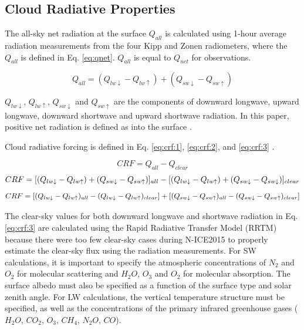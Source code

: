 \subsection{Cloud Radiative Properties}
The all-sky net radiation at the surface $Q_{all}$ is calculated using 1-hour average radiation measurements from the four Kipp and Zonen radiometers, where the $Q_{all}$ is defined in Eq. \ref{eq:qnet}. $Q_{all}$ is equal to $Q_{net}$ for observations.

\begin{equation}\label{eq:qnet}
Q_{all} = (Q_{lw \downarrow} - Q_{lw \uparrow}) + (Q_{sw \downarrow} - Q_{sw \uparrow})
\end{equation}

$Q_{lw \downarrow}$, $Q_{lw \uparrow}$, $Q_{sw \downarrow}$ and $Q_{sw \uparrow}$ are the components of downward longwave, upward longwave, downward shortwave and upward shortwave radiation. In this paper, positive net radiation is defined as into the surface \citep{miller:2015}.

Cloud radiative forcing is defined in Eq. \ref{eq:crf:1}, \ref{eq:crf:2}, and \ref{eq:crf:3} \citep{ramanathan:1989, miller:2015}.

\begin{equation}\label{eq:crf:1}
CRF = Q_{all} - Q_{clear}
\end{equation}
\begin{dmath}\label{eq:crf:2}
CRF = [(Q_{lw \downarrow} - Q_{lw \uparrow}) + (Q_{sw \downarrow} - Q_{sw \uparrow})]_{all} \\
\\ - [(Q_{lw \downarrow} - Q_{lw \uparrow}) + (Q_{sw \downarrow} - Q_{sw \downarrow})]_{clear}
\end{dmath}
\begin{dmath}\label{eq:crf:3}
CRF = [(Q_{lw \downarrow} - Q_{lw \uparrow})_{all} - (Q_{lw \downarrow} - Q_{lw \uparrow})_{clear}] \\
\\ + [(Q_{sw \downarrow} - Q_{sw \uparrow})_{all} -  (Q_{sw \downarrow} - Q_{sw \uparrow})_{clear}]
\end{dmath}

The clear-sky values for both downward longwave and shortwave radiation in Eq. \ref{eq:crf:3} are calculated using the Rapid Radiative Transfer Model (RRTM) \citep{mlawer:1997} because there were too few clear-sky cases during N-ICE2015 to properly estimate the clear-sky flux using the radiation measurements. For SW calculations, it is important to specify the atmospheric concentrations of $N_{2}$ and $O_{2}$ for molecular scattering and $H_{2}O$, $O_{3}$ and $O_{2}$ for molecular absorption. The surface albedo must also be specified as a function of the surface type and solar zenith angle. For LW calculations, the vertical temperature structure must be specified, as well as the concentrations of the primary infrared greenhouse gases ($H_{2}O$, $CO_{2}$, $O_{3}$, $CH_{4}$, $N_{2}O$, $CO$).

